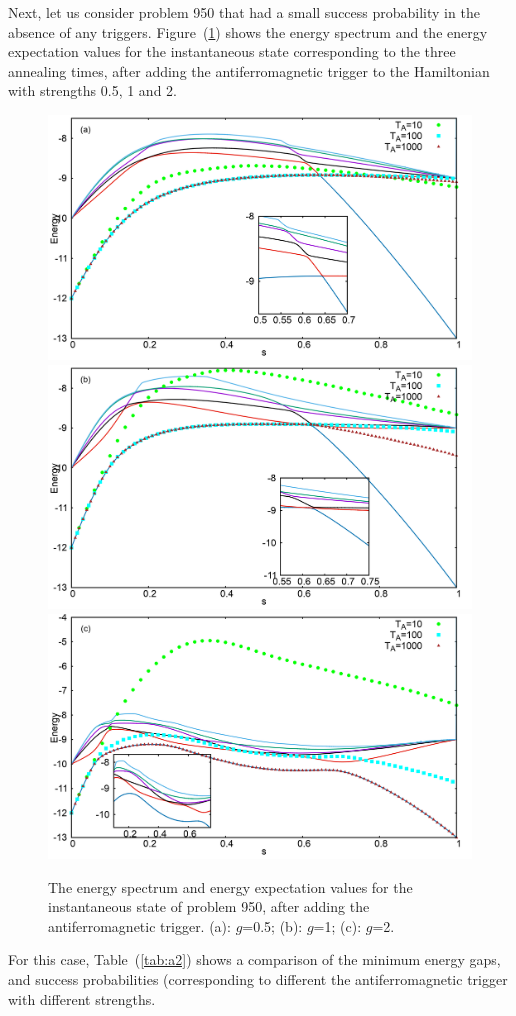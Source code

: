 \documentclass[../main.tex]{subfiles}
\begin{document}
Next, let us consider problem 950 that had a small success probability in the absence of any triggers. Figure~(\ref{fig:a4}) shows the energy spectrum and the energy expectation values for the instantaneous state corresponding to the three annealing times, after adding the antiferromagnetic trigger to the Hamiltonian with strengths 0.5, 1 and 2. 


\begin{figure}
\centering 
\includegraphics[scale=0.24]{950_s12_A_g0.png}
\includegraphics[scale=0.24]{950_s12_A_g1.png}
\includegraphics[scale=0.24]{950_s12_A_g2.png}
\caption{The energy spectrum and energy expectation values for the instantaneous state of problem 950, after adding the antiferromagnetic trigger. (a): $g$=0.5; (b): $g$=1; (c): $g$=2. }
\label{fig:a4}
\end{figure}
For this case, Table~(\ref{tab:a2}) shows a comparison of the minimum energy gaps, and success probabilities (corresponding to different the antiferromagnetic trigger with different strengths. 
\end{document}
